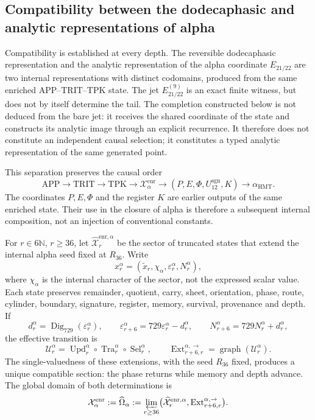 \subsection{Compatibility between the dodecaphasic and analytic representations of alpha}
\label{subsec:alpha-publicaciones-completas}

Compatibility is established at every depth. The reversible
dodecaphasic representation and the analytic representation of the alpha
coordinate
\(E_{21/22}\) are two internal representations with distinct codomains,
produced from the same enriched APP--TRIT--TPK state. The jet
\(E_{21/22}^{(9)}\) is an exact finite witness, but does not by itself determine
the tail. The completion constructed below is not deduced from the bare
jet: it receives the shared coordinate of the state and constructs its
analytic image through an explicit recurrence. It therefore does not constitute
an independent causal selection; it constitutes a typed analytic
representation of the same generated point.

This separation preserves the causal order
\[
 \mathrm{APP}\longrightarrow\mathrm{TRIT}\longrightarrow\mathrm{TPK}
 \longrightarrow\mathcal X_{\alpha}^{\mathrm{enr}}
 \longrightarrow (P,E,\Phi,U_{12}^{\mathrm{sgn}},K)
 \longrightarrow\alpha_{\mathrm{HMT}}.
\]
The coordinates \(P,E,\Phi\) and the register \(K\) are earlier outputs of
the same enriched state. Their use in the closure of alpha is therefore a
subsequent internal composition, not an injection of conventional
constants.

For \(r\in6\mathbb N\), \(r\ge36\), let
\(\widehat{\mathcal X}^{\mathrm{enr},\alpha}_r\) be the sector of truncated
states that extend the internal alpha seed fixed at \(R_{36}\). Write
\[
 x_r^\alpha=(\widetilde x_r,\chi_\alpha,
              \varepsilon_r^\alpha,N_r^\alpha),
\]
where \(\chi_\alpha\) is the internal character of the sector, not the expressed
scalar value. Each state preserves remainder, quotient, carry, sheet, orientation,
phase, route, cylinder, boundary, signature, register, memory, survival,
provenance and depth. If
\[
 d_r^\alpha=\operatorname{Dig}_{729}(\varepsilon_r^\alpha),\qquad
 \varepsilon_{r+6}^\alpha=729\varepsilon_r^\alpha-d_r^\alpha,
 \qquad N_{r+6}^\alpha=729N_r^\alpha+d_r^\alpha,
\]
the effective transition is
\[
 \mathcal U_r^\alpha=
 \operatorname{Upd}_r^\alpha\circ
 \operatorname{Tra}_r^\alpha\circ
 \operatorname{Sel}_r^\alpha,
 \qquad
 \operatorname{Ext}^{\alpha,\to}_{r+6,r}
 =\operatorname{graph}(\mathcal U_r^\alpha).
\]
The single-valuedness of these extensions, with the seed \(R_{36}\) fixed,
produces a unique compatible section: the phase returns while memory and
depth advance. The global domain of both determinations is
\begin{equation}
 \mathcal X_\alpha^{\mathrm{enr}}:=\widehat\Omega_\alpha
 :=\varprojlim_{r\ge36}
 \bigl(\widehat{\mathcal X}^{\mathrm{enr},\alpha}_r,
       \operatorname{Ext}^{\alpha,\to}_{r+6,r}\bigr).
 \label{eq:alpha-dominio-enriquecido-completo}
\end{equation}

